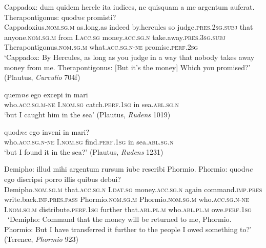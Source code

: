 \begin{exe}
\ex
\gll Cappadox: dum quidem hercle ita iudices, ne quisquam a me argentum auferat. Therapontigonus: quod\emph{ne} promisti?\\
Cappadoxius.\textsc{nom.sg.m} as.long.as indeed by.hercules so judge.\textsc{pres.2sg.subj} that anyone.\textsc{nom.sg.m} from I.\textsc{acc.sg} money.\textsc{acc.sg.n} take.away.\textsc{pres.3sg.subj} Therapontigonus.\textsc{nom.sg.m} what.\textsc{acc.sg.n}-\textsc{ne} promise.\textsc{perf.2sg}\\
\trans `Cappadox: By Hercules, as long as you judge in a way that nobody takes away money from me. Therapontigonus: [But it's the money] Which you promised?' (Plautus, \textit{Curculio} 704f) 
\label{ne8x}
\end{exe}

\begin{exe}
\ex
\gll quem\emph{ne} ego excepi in mari\\
who.\textsc{acc.sg.m}-\textsc{ne} I.\textsc{nom.sg} catch.\textsc{perf.1sg} in sea.\textsc{abl.sg.n}\\
\trans `but I caught him in the sea' (Plautus, \textit{Rudens} 1019) 
\label{ne9x}
\end{exe}

\begin{exe}
\ex
\gll quod\emph{ne} ego inveni in mari?\\
who.\textsc{acc.sg.n}-\textsc{ne} I.\textsc{nom.sg} find.\textsc{perf.1sg} in sea.\textsc{abl.sg.n}\\
\trans `but I found it in the sea?' (Plautus, \textit{Rudens} 1231) 
\label{ne10x}
\end{exe}

\begin{exe}
\ex
\gll Demipho: illud mihi argentum rursum iube rescribi Phormio. Phormio: quod\emph{ne} ego discripsi porro illis quibus debui?\\
Demipho.\textsc{nom.sg.m} that.\textsc{acc.sg.n} I.\textsc{dat.sg} money.\textsc{acc.sg.n} again command.\textsc{imp.pres} write.back.\textsc{inf.pres.pass} Phormio.\textsc{nom.sg.m} Phormio.\textsc{nom.sg.m} who.\textsc{acc.sg.n}-\textsc{ne} I.\textsc{nom.sg.m} distribute.\textsc{perf.1sg} further that.\textsc{abl.pl.m} who.\textsc{abl.pl.m} owe.\textsc{perf.1sg}\\\
\trans `Demipho: Command that the money will be returned to me, Phormio. Phormio: But I have transferred it further to the people I owed something to?' (Terence, \textit{Phormio} 923) 
\label{ne11x}
\end{exe}


